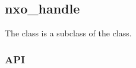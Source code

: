 %
%
%
%
%

\subsection{nxo\_handle}
\label{nxo_handle}

The  class is a subclass of the  class.

\subsubsection{API}
